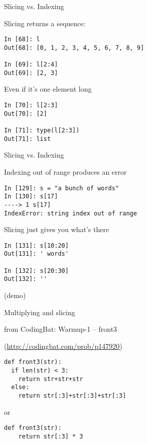 \documentclass{beamer}
\begin{document}
\begin{frame}[fragile]{Slicing vs. Indexing}

{\Large Slicing returns a sequence:}

\begin{verbatim}
In [68]: l
Out[68]: [0, 1, 2, 3, 4, 5, 6, 7, 8, 9]

In [69]: l[2:4]
Out[69]: [2, 3]
\end{verbatim}

Even if it's one element long

\begin{verbatim}
In [70]: l[2:3]
Out[70]: [2]

In [71]: type(l[2:3])
Out[71]: list
\end{verbatim}

\end{frame}

\begin{frame}[fragile]{Slicing vs. Indexing}

{\Large Indexing out of range produces an error}
\vfill
\begin{verbatim}
In [129]: s = "a bunch of words"
In [130]: s[17]
----> 1 s[17]
IndexError: string index out of range
\end{verbatim}

\vfill
{\Large Slicing just gives you what's there}

\begin{verbatim}
In [131]: s[10:20]
Out[131]: ' words'

In [132]: s[20:30]
Out[132]: ''
\end{verbatim}
(demo)
\end{frame}

\begin{frame}[fragile]{Multiplying and slicing}

{\Large from CodingBat: Warmup-1 -- front3}

(\url{http://codingbat.com/prob/p147920})

\begin{verbatim}
def front3(str):
  if len(str) < 3:
    return str+str+str
  else:
    return str[:3]+str[:3]+str[:3]
\end{verbatim}

{\Large or}

\begin{verbatim}
def front3(str):
    return str[:3] * 3
\end{verbatim}

\end{frame} 
\end{document}
